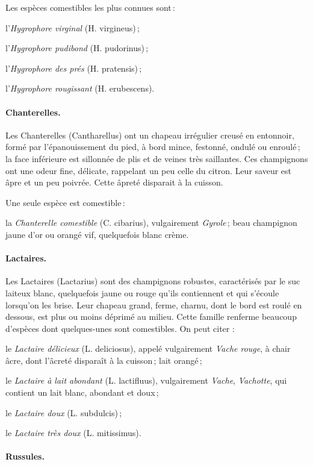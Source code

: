 Les espèces comestibles les plus connues sont :

l'\textit{Hygrophore virginal} (H. virgineus) ;

l'\textit{Hygrophore pudibond} (H. pudorinus) ;

l'\textit{Hygrophore des prés} (H. pratensis) ;

l'\textit{Hygrophore rougissant} (H. erubescens).

\paragraph{Chanterelles.}

Les Chanterelles (Cantharellus) ont un chapeau irrégulier creusé en entonnoir,
formé par l'épanouissement du pied, à bord mince, festonné, ondulé ou enroulé ;
la face inférieure est sillonnée de plis et de veines très saillantes. Ces
champignons ont une odeur fine, délicate, rappelant un peu celle du citron.
Leur saveur est âpre et un peu poivrée. Cette âpreté disparait à la cuisson.

Une seule espèce est comestible :

la \textit{Chanterelle comestible} (C. cibarius), vulgairement
\textit{Gyrole} ; beau champignon jaune d’or ou orangé vif, quelquefois blanc
crème.

\paragraph{Lactaires.}

Les Lactaires (Lactarius) sont des champignons robustes, caractérisés par le
suc laiteux blanc, quelquefois jaune ou rouge qu'ils contiennent et qui
s'écoule lorsqu'on les brise. Leur chapeau grand, ferme, charnu, dont le bord
est roulé en dessous, est plus ou moins déprimé au milieu. Cette famille
renferme beaucoup d'espèces dont quelques-unes sont comestibles. On peut citer
:

le \textit{Lactaire délicieux} (L. deliciosus), appelé vulgairement
\textit{Vache rouge}, à chair âcre, dont l’âcreté disparaît à la cuisson ; lait
orangé ;

le \textit{Lactaire à lait abondant} (L. lactifluus), vulgairement
\textit{Vache}, \textit{Vachotte}, qui contient un lait blanc, abondant et
doux ;

le \textit{Lactaire doux} (L. subdulcis) ;

le \textit{Lactaire très doux} (L. mitissimus).

\paragraph{Russules.}


